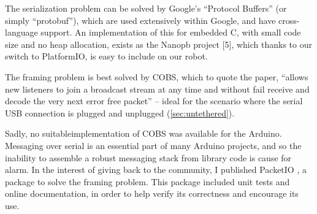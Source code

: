 \documentclass[main.tex]{subfiles}
\begin{document}
	The serialization problem can be solved by Google’s \enquote{Protocol Buffers}\cite{protobuf} (or simply \enquote{protobuf}), which are used extensively within Google, and have cross-language support. An implementation of this for embedded C, with small code size and no heap allocation, exists as the Nanopb project [5], which thanks to our switch to PlatformIO, is easy to include on our robot.

	The framing problem is best solved by COBS\cite{cobs}, which to quote the paper, \enquote{allows new listeners to join a broadcast stream at any time and without fail receive and decode the very next error free packet} – ideal for the scenario where the serial USB connection is plugged and unplugged (\cref{sec:untethered}).

	Sadly, no suitable\footnotemark implementation of COBS was available for the Arduino.
	Messaging over serial is an essential part of many Arduino projects, and so the inability to assemble a robust messaging stack from library code is cause for alarm.
	In the interest of giving back to the community, I published PacketIO \cite{packetio}, a package to solve the framing problem.
	This package included unit tests and online documentation, in order to help verify its correctness and encourage its use.


\bib
\end{document}
